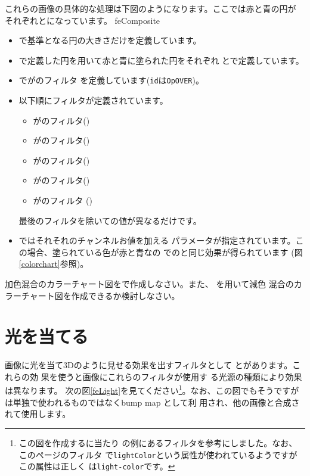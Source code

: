  これらの画像の具体的な処理は下図のようになります。ここでは赤と青の円が
 それぞれとになっています。
{feComposite}

\begin{itemize}
 \item {}で基準となる円の大きさだけを定義しています。
 \item {}で定義した円を用いて赤と青に塗られた円をそれぞれ
       とで定義しています。
 \item {}でがのフィルタ
       を定義しています(\texttt{id}は\texttt{OpOVER})。
 \item 以下順にフィルタが定義されています。
\begin{itemize}
 \item {}がのフィルタ()
 \item {}がのフィルタ()
 \item {}がのフィルタ()
 \item {}がのフィルタ()
 \item {}がのフィルタ
       ()
\end{itemize}
最後のフィルタを除いての値が異なるだけです。
 \item {}ではそれそれのチャンネルお値を加える
      パラメータが指定されています。この場合、塗られている色が赤と青なの
       でのと同じ効果が得られています
       (図\ref{colorchart}参照)。
\end{itemize}
\begin{Problem}
加色混合のカラーチャート図をで作成しなさい。また、
を用いて減色
 混合のカラーチャート図を作成できるか検討しなさい。
\end{Problem}
\iffalse\else
\section{光を当てる}
画像に光を当て3Dのように見せる効果を出すフィルタとして
とがあります。これらの効
果を使うと画像にこれらのフィルタが使用す
る光源の種類により効果は異なります。
次の図\ref{feLight}を見てください\footnote{この図を作成するに当たり
の例にあるフィルタを参考にしました。なお、このページのフィルタ
で\texttt{lightColor}という属性が使われているようですがこの属性は正しく
は\texttt{light-color}です。}。なお、この図でもそうですが
は単独で使われるものではなくbump map として利
用され、他の画像と合成されて使用します。
